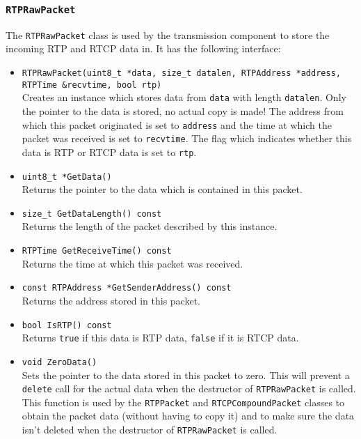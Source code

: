 \documentclass[12pt,a4paper]{article}
\newcommand{\headerfile}[1]{\marginpar{\scriptsize Header:\\{\tt #1}}}
\begin{document}
			\subsubsection{\tt RTPRawPacket}\headerfile{rtprawpacket.h}
				
				The {\tt RTPRawPacket} class is used by the transmission component
				to store the incoming RTP and RTCP data in. It has the following 
				interface:
				\begin{itemize}
					\item {\tt RTPRawPacket(uint8\_t *data, size\_t datalen, RTPAddress *address, RTPTime \&recvtime, bool rtp)}\\
						Creates an instance which stores data from {\tt data} with
						length {\tt datalen}. Only the pointer to the data is stored,
						no actual copy is made! The address from which this packet
						originated is set to {\tt address} and the time at which
						the packet was received is set to {\tt recvtime}. The flag
						which indicates whether this data is RTP or RTCP data is set
						to {\tt rtp}.
					\item {\tt uint8\_t *GetData()}\\
						Returns the pointer to the data which is contained in this
						packet.
					\item {\tt size\_t GetDataLength() const}\\
						Returns the length of the packet described by this instance.
					\item {\tt RTPTime GetReceiveTime() const}\\
						Returns the time at which this packet was received.
					\item {\tt const RTPAddress *GetSenderAddress() const}\\
						Returns the address stored in this packet.
					\item {\tt bool IsRTP() const}\\
						Returns {\tt true} if this data is RTP data, {\tt false} if it is RTCP
						data.
					\item {\tt void ZeroData()}\\
						Sets the pointer to the data stored in this packet to zero.
						This will prevent a {\tt delete} call for the actual data when
						the destructor of {\tt RTPRawPacket} is called. This function
						is used by the {\tt RTPPacket} and {\tt RTCPCompoundPacket}
						classes to obtain the packet data (without having to copy it)
						and to make sure the data isn't deleted when the destructor
						of {\tt RTPRawPacket} is called.
				\end{itemize}
\end{document}
